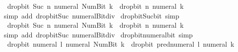 \begin{isabellebody}
\ \ {\isacartoucheopen}drop{\isacharunderscore}{\kern0pt}bit\ {\isacharparenleft}{\kern0pt}Suc\ n{\isacharparenright}{\kern0pt}\ {\isacharparenleft}{\kern0pt}numeral\ {\isacharparenleft}{\kern0pt}Num{\isachardot}{\kern0pt}Bit{}\ k{\isacharparenright}{\kern0pt}{\isacharparenright}{\kern0pt}\ {\isacharequal}{\kern0pt}\ drop{\isacharunderscore}{\kern0pt}bit\ n\ {\isacharparenleft}{\kern0pt}numeral\ k{\isacharparenright}{\kern0pt}{\isacartoucheclose}\isanewline
%
\isadelimproof
\ \ %
\endisadelimproof
%
\isatagproof
{}\isamarkupfalse%
\ {\isacharparenleft}{\kern0pt}simp\ add{\isacharcolon}{\kern0pt}\ drop{\isacharunderscore}{\kern0pt}bit{\isacharunderscore}{\kern0pt}Suc\ numeral{\isacharunderscore}{\kern0pt}Bit{}{\isacharunderscore}{\kern0pt}div{\isacharunderscore}{\kern0pt}{}{\isacharparenright}{\kern0pt}%
\endisatagproof
{\isafoldproof}%
%
\isadelimproof
\isanewline
%
\endisadelimproof
\isanewline
{}\isamarkupfalse%
\ drop{\isacharunderscore}{\kern0pt}bit{\isacharunderscore}{\kern0pt}Suc{\isacharunderscore}{\kern0pt}bit{}\ {\isacharbrackleft}{\kern0pt}simp{\isacharbrackright}{\kern0pt}{\isacharcolon}{\kern0pt}\isanewline
\ \ {\isacartoucheopen}drop{\isacharunderscore}{\kern0pt}bit\ {\isacharparenleft}{\kern0pt}Suc\ n{\isacharparenright}{\kern0pt}\ {\isacharparenleft}{\kern0pt}numeral\ {\isacharparenleft}{\kern0pt}Num{\isachardot}{\kern0pt}Bit{}\ k{\isacharparenright}{\kern0pt}{\isacharparenright}{\kern0pt}\ {\isacharequal}{\kern0pt}\ drop{\isacharunderscore}{\kern0pt}bit\ n\ {\isacharparenleft}{\kern0pt}numeral\ k{\isacharparenright}{\kern0pt}{\isacartoucheclose}\isanewline
%
\isadelimproof
\ \ %
\endisadelimproof
%
\isatagproof
{}\isamarkupfalse%
\ {\isacharparenleft}{\kern0pt}simp\ add{\isacharcolon}{\kern0pt}\ drop{\isacharunderscore}{\kern0pt}bit{\isacharunderscore}{\kern0pt}Suc\ numeral{\isacharunderscore}{\kern0pt}Bit{}{\isacharunderscore}{\kern0pt}div{\isacharunderscore}{\kern0pt}{}{\isacharparenright}{\kern0pt}%
\endisatagproof
{\isafoldproof}%
%
\isadelimproof
\isanewline
%
\endisadelimproof
\isanewline
{}\isamarkupfalse%
\ drop{\isacharunderscore}{\kern0pt}bit{\isacharunderscore}{\kern0pt}numeral{\isacharunderscore}{\kern0pt}bit{}\ {\isacharbrackleft}{\kern0pt}simp{\isacharbrackright}{\kern0pt}{\isacharcolon}{\kern0pt}\isanewline
\ \ {\isacartoucheopen}drop{\isacharunderscore}{\kern0pt}bit\ {\isacharparenleft}{\kern0pt}numeral\ l{\isacharparenright}{\kern0pt}\ {\isacharparenleft}{\kern0pt}numeral\ {\isacharparenleft}{\kern0pt}Num{\isachardot}{\kern0pt}Bit{}\ k{\isacharparenright}{\kern0pt}{\isacharparenright}{\kern0pt}\ {\isacharequal}{\kern0pt}\ drop{\isacharunderscore}{\kern0pt}bit\ {\isacharparenleft}{\kern0pt}pred{\isacharunderscore}{\kern0pt}numeral\ l{\isacharparenright}{\kern0pt}\ {\isacharparenleft}{\kern0pt}numeral\ k{\isacharparenright}{\kern0pt}{\isacartoucheclose}\isanewline

\end{isabellebody}
